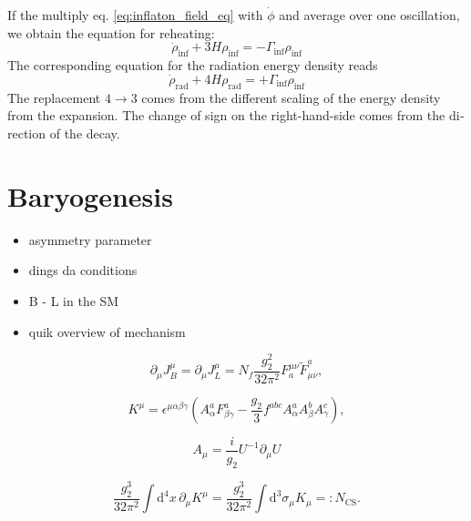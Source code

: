 \documentclass[master,       %
               twoside,        %
               BCOR10mm,       %
               english,ngerman, %
               ]{GAUBM}
\begin{document}
\begin{otherlanguage}{english}
If the multiply eq. \eqref{eq:inflaton_field_eq} with $\dot{\phi}$ and average over one oscillation, we obtain 
the equation for reheating:
\begin{equation}
	\dot{\rho}_\mathrm{inf} + 3 H \rho_\mathrm{inf} = - \Gamma_\mathrm{inf} \rho_\mathrm{inf}
\end{equation}
The corresponding equation for the radiation energy density reads
\begin{equation}
	\dot{\rho}_\mathrm{rad} + 4 H \rho_\mathrm{rad} = + \Gamma_\mathrm{inf} \rho_\mathrm{inf}
\end{equation}
The replacement $4 \to 3$ comes from the different scaling of the energy density from the expansion. The change of sign on the right-hand-side comes from the direction of the decay.


\section{Baryogenesis}
\begin{itemize}
	\item asymmetry parameter
	\item dings da conditions
	\item B - L in the SM
	\item quik overview of mechanism 
\end{itemize}

\begin{equation}
	\label{eq:B_and_L_current_equations}
	\partial_\mu J^\mu_B = \partial_\mu J^\mu_L = N_f \frac{g_2^2}{32 \pi^2} F^{\mu \nu}_a \tilde{F}_{\mu \nu}^a,
\end{equation}

\begin{equation}
	\label{eq:chern_simons_current}
	K^\mu = \epsilon^{\mu \alpha \beta \gamma} \left( A^a_\alpha F^a_{\beta \gamma} - \frac{g_2}{3} f^{abc} A^a_\alpha A^b_\beta A^c_\gamma \right),
\end{equation}

\begin{equation}
	A_\mu = \frac{i}{g_2} U^{-1} \partial_\mu U
\end{equation}

\begin{equation}
	\label{eq:chern_simons_number}
	\frac{g_2^3}{32 \pi^2} \int \mathrm{d}^4 x \, \partial_\mu K^\mu =
	\frac{g_2^3}{32 \pi^2} \int \mathrm{d}^3 \sigma_\mu K_\mu
	=: N_{\mathrm{CS}}.
\end{equation}


\end{otherlanguage}
\end{document}

